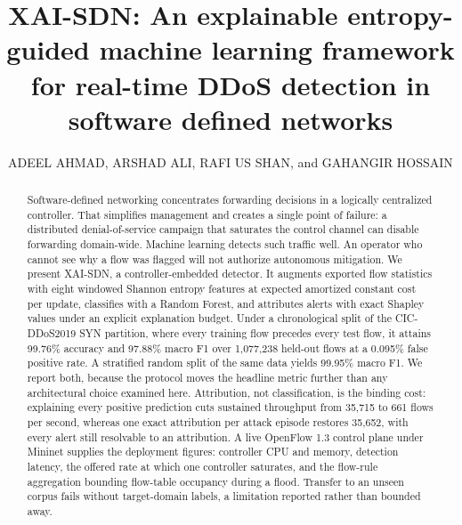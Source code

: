 \documentclass{ieeeaccess}
\begin{document}



\title{XAI-SDN: An explainable entropy-guided machine learning framework for real-time DDoS detection in software defined networks}

\author{\uppercase{Adeel Ahmad},
\uppercase{Arshad Ali}, \uppercase{Rafi us Shan}, and \uppercase{Gahangir Hossain}}

\address[1]{Faculty of Computer and Information Systems, Islamic University of Madinah, Al Madinah Al Munawarah, Saudi Arabia}
\address[2]{Faculty of Computer Information Science, Higher Colleges Of Technology, Al Mizn - Baniyas North - Abu Dhabi, United Arab Emirates}
\address[3]{Anuradha and Vikas Sinha Department of Data Science, University of North Texas, Denton, TX, USA, 76203-5017}



\begin{abstract}
Software-defined networking concentrates forwarding decisions in a logically centralized
controller. That simplifies management and creates a single point of failure: a distributed
denial-of-service campaign that saturates the control channel can disable forwarding
domain-wide. Machine learning detects such traffic well. An operator who cannot see why a flow was
flagged will not authorize autonomous mitigation. We present XAI-SDN, a controller-embedded detector. It augments exported flow statistics with eight windowed Shannon
entropy features at expected amortized constant cost per update, classifies with a Random
Forest, and attributes alerts with exact Shapley values under an explicit explanation budget.
Under a chronological split of the CIC-DDoS2019 SYN partition, where every training flow
precedes every test flow, it attains 99.76\% accuracy and 97.88\% macro F1 over 1,077,238
held-out flows at a 0.095\% false positive rate. A stratified random split of the same data
yields 99.95\% macro F1. We report both, because the protocol moves the headline metric
further than any architectural choice examined here. Attribution, not classification, is the
binding cost: explaining every positive prediction cuts sustained throughput from 35,715 to 661
flows per second, whereas one exact attribution per attack episode restores 35,652, with every
alert still resolvable to an attribution. A live OpenFlow 1.3 control plane under Mininet
supplies the deployment figures: controller CPU and memory, detection latency, the offered rate at
which one controller saturates, and the flow-rule aggregation bounding flow-table occupancy during a flood. Transfer to an unseen corpus fails without target-domain labels, a limitation
reported rather than bounded away.
\end{abstract}
\end{document}
